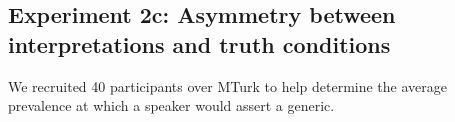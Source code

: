 \documentclass{pnastwo}
\begin{document}
\begin{article}
\begin{materials}

\subsection{Experiment 2c: Asymmetry between interpretations and truth conditions}
%
%
%
We recruited 40 participants over MTurk to help determine the average prevalence at which a speaker would assert a generic.  

\end{materials}
\end{article}
\end{document}
